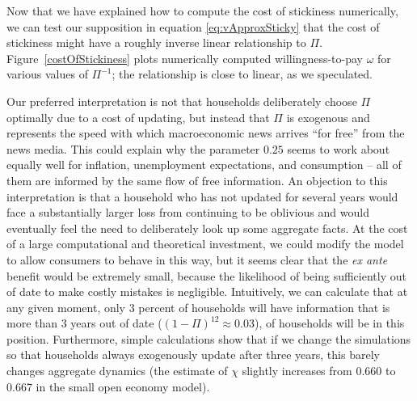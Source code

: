 Now that we have explained how to compute the cost of stickiness numerically, we can test our supposition in equation \eqref{eq:vApproxSticky} that the cost of stickiness might have a roughly inverse linear relationship to $\Pi$.  Figure~\ref{costOfStickiness} plots numerically computed willingness-to-pay $\omega$ for various values of $\Pi^{-1}$; the relationship is close to linear, as we speculated.

Our preferred interpretation is not that households deliberately choose $\Pi$ optimally due to a cost of updating, but instead that $\Pi$ is exogenous and represents the speed with which macroeconomic news arrives ``for free'' from the news media.  This could explain why the parameter $0.25$ seems to work about equally well for inflation, unemployment expectations, and consumption -- all of them are informed by the same flow of free information. An objection to this interpretation is that a household who has not updated for several years would face a substantially larger loss from continuing to be oblivious and would eventually feel the need to deliberately look up some aggregate facts.  At the cost of a large computational and theoretical investment, we could modify the model to allow consumers to behave in this way, but it seems clear that the {\it ex ante} benefit would be extremely small, because the likelihood of being sufficiently out of date to make costly mistakes is negligible.  Intuitively, we can calculate that at any given moment, only 3 percent of households will have information that is more than 3 years out of date ($(1-\Pi)^{12} \approx 0.03$), of households will be in this position.  Furthermore, simple calculations show that if we change the simulations so that households always exogenously update after three years, this barely changes aggregate dynamics (the estimate of $\chi$ slightly increases from 0.660 to 0.667 in the small open economy model).

